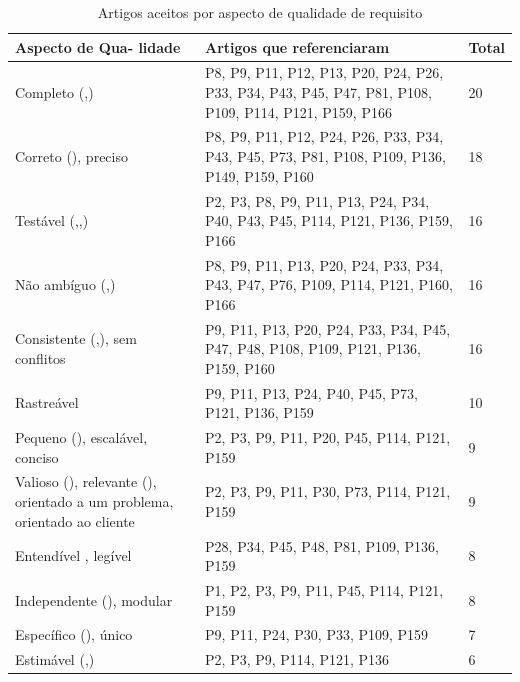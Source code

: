 \begin{table}[!t]
\renewcommand{\arraystretch}{1.3}
\caption{Artigos aceitos por aspecto de qualidade de requisito}
\label{table:artigos_por_aspecto}
\centering
\begin{tabular}{|m{1.7cm}|m{5cm}|m{0.4cm}|}
\hline
Aspecto de Qua- lidade & Artigos que referenciaram & Total \\ 
\hline\hline
Completo (\cite{Babok_2015},\cite{Babok_2009}) & P8, P9, P11, P12, P13, P20, P24, P26, P33, P34, P43, P45, P47, P81, P108, P109, P114, P121, P159, P166 & 20  \\ 
\hline
Correto (\cite{Babok_2009}), preciso & P8, P9, P11, P12, P24, P26, P33, P34, P43, P45, P73, P81, P108, P109, P136, P149, P159, P160 & 18  \\ 
\hline
Testável (\cite{Babok_2015},\cite{Babok_2009},\cite{SMART_INVEST_2013}) & P2, P3, P8, P9, P11, P13, P24, P34, P40, P43, P45, P114, P121, P136, P159, P166 & 16 \\ 
\hline
Não ambíguo (\cite{Babok_2015},\cite{Babok_2009}) & P8, P9, P11, P13, P20, P24, P33, P34, P43, P47, P76, P109, P114, P121, P160, P166 & 16 \\ 
\hline
Consistente (\cite{Babok_2015},\cite{Babok_2009}), sem conflitos & P9, P11, P13, P20, P24, P33, P34, P45, P47, P48, P108, P109, P121, P136, P159, P160 & 16  \\ 
\hline
Rastreável & P9, P11, P13, P24, P40, P45, P73, P121, P136, P159 & 10 \\ 
\hline
Pequeno (\cite{SMART_INVEST_2013}), escalável, conciso & P2, P3, P9, P11, P20, P45, P114, P121, P159 & 9 \\ 
\hline
Valioso (\cite{SMART_INVEST_2013}), relevante (\cite{SMART_INVEST_2013}), orientado a um problema, orientado ao cliente & P2, P3, P9, P11, P30, P73, P114, P121, P159 & 9 \\ 
\hline
Entendível \cite{Babok_2015}, legível & P28, P34, P45, P48, P81, P109, P136, P159 & 8 \\ 
\hline
Independente (\cite{SMART_INVEST_2013}), modular & P1, P2, P3, P9, P11, P45, P114, P121, P159 & 8 \\ 
\hline
Específico (\cite{SMART_INVEST_2013}), único & P9, P11, P24, P30, P33, P109, P159 & 7 \\ 
\hline
Estimável (\cite{Babok_2015},\cite{SMART_INVEST_2013}) & P2, P3, P9, P114, P121, P136 & 6 \\ 

\end{tabular}
\end{table}
